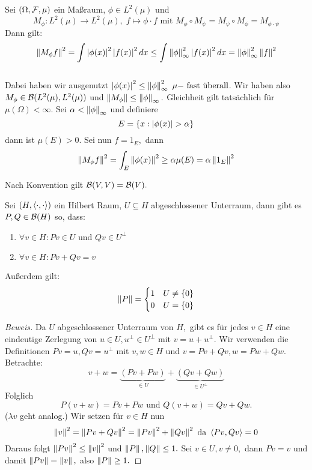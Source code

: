 \begin{ex}[Multiplikationsoperatoren] \label{Mult_op}
    Sei $(\Omega, \mathcal{F}, \mu)$ ein Maßraum, $\phi \in L^2(\mu)$ und \[M_{\phi}: L^2(\mu) \to L^2(\mu), \;f \mapsto \phi \cdot f \text{ mit } M_{\phi} \circ M_{\psi} = M_{\psi} \circ M_{\phi} = M_{\phi \cdot \psi}\] Dann gilt:
    \[\left\lVert M_{\phi}f\right\rVert^2 = \int \left\lvert \phi(x) \right\rvert^2 \left\lvert f(x) \right\rvert^2dx \leq \int \left\lVert\phi\right\rVert_\infty^2 \left\lvert f(x) \right\rvert^2dx = \left\lVert\phi\right\rVert_\infty^2\left\lVert f\right\rVert^2 \] \\ 
    Dabei haben wir ausgenutzt \(\left\lvert \phi(x) \right\rvert^2 \leq \left\lVert\phi\right\rVert_\infty^2 \text{ $\mu-$ fast überall}\). Wir haben also $M_{\phi} \in \mathcal{B}(L^2(\mu), L^2(\mu))$ und $\left\lVert M_{\phi}\right\rVert \leq \left\lVert\phi\right\rVert_\infty.$ Gleichheit gilt tatsächlich für $\mu(\Omega) < \infty.$ Sei $\alpha < \left\lVert\phi\right\rVert_\infty$ und definiere
    \[E = \left\{x: \left\lvert \phi(x)  \right\rvert> \alpha\right\}\]
    dann ist $\mu(E)>0.$ Sei nun $f = 1_E,$ dann 
    \[\left\lVert M_{\phi}f\right\rVert^2 = \int_E \left\lVert\phi(x)\right\rVert^2 \geq \alpha \mu(E) = \alpha \left\lVert1_E\right\rVert^2\]
\end{ex}

\begin{rem}
    Nach Konvention gilt $\mathcal{B}(V, V) = \mathcal{B}(V).$
\end{rem}

\begin{theorem}
    Sei $(H, \left\langle\cdot, \cdot\right\rangle)$ ein Hilbert Raum, $U \subseteq H$ abgeschlossener Unterraum, dann gibt es $P, Q \in \mathcal{B}(H)$ so, dass:
    \label{PQ_Zerlegung}
    \begin{enumerate}
        \item $\forall v \in H: Pv \in U$ und $Qv \in U^{\perp}$
        \item $\forall v \in H: Pv + Qv = v$
    \end{enumerate}
    Außerdem gilt: 
    \[\left\lVert P\right\rVert = \begin{cases} 1 & U \not= \left\{0\right\} \\
    0 & U = \left\{0\right\}
    \end{cases}\]
    
    \begin{proof}[Beweis] Da $U$ abgeschlossener Unterraum von $H,$ gibt es für jedes $v \in H$ eine eindeutige Zerlegung von $u \in U, u^{\perp} \in U^{\perp}$ mit $v = u + u^{\perp}.$ Wir verwenden die Definitionen $Pv = u, Qv = u^{\perp}$ mit $v, w \in H$ und $v = Pv + Qv, w = Pw + Qw.$ Betrachte: \[v + w = \underbrace{(Pv + Pw)}_{\in U} + \underbrace{(Qv + Qw)}_{\in U^{\perp}}\]
    Folglich \[P(v + w) = Pv + Pw \text{ und } Q(v+w) = Qv + Qw.\] ($\lambda v$ geht analog.) Wir setzen für $v \in H$ nun 
    \[\left\lVert v\right\rVert^2 = \left\lVert Pv + Qv\right\rVert^2 = \left\lVert Pv\right\rVert^2 + \left\lVert Qv\right\rVert^2 \text{ da } \left\langle Pv, Qv\right\rangle = 0\] Daraus folgt $\left\lVert Pv\right\rVert^2 \leq \left\lVert v\right\rVert^2$ und $\left\lVert P\right\rVert, \left\lVert Q\right\rVert \leq 1.$ Sei $v \in U, v \not= 0,$ dann $Pv = v$ und damit $\left\lVert Pv\right\rVert = \left\lVert v\right\rVert,$ also $\left\lVert P\right\rVert \geq 1.$
    \end{proof}
\end{theorem}

